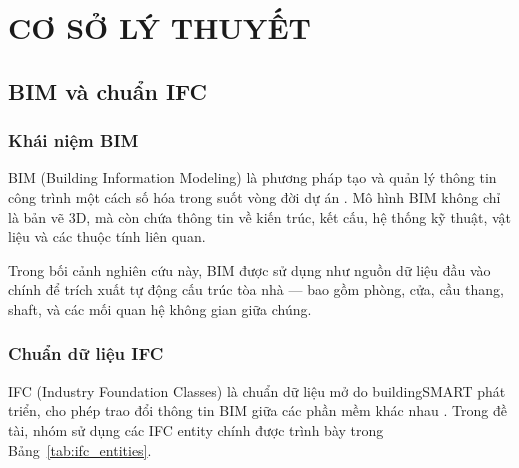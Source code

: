 
\chapter{CƠ SỞ LÝ THUYẾT}
\label{chap:cosoly}

\section{BIM và chuẩn IFC}
\label{sec:bimifc}

\subsection{Khái niệm BIM}

BIM (Building Information Modeling) là phương pháp tạo và quản lý thông tin công trình một cách số hóa trong suốt vòng đời dự án \cite{eastman2011bim}. Mô hình BIM không chỉ là bản vẽ 3D, mà còn chứa thông tin về kiến trúc, kết cấu, hệ thống kỹ thuật, vật liệu và các thuộc tính liên quan.

Trong bối cảnh nghiên cứu này, BIM được sử dụng như nguồn dữ liệu đầu vào chính để trích xuất tự động cấu trúc tòa nhà — bao gồm phòng, cửa, cầu thang, shaft, và các mối quan hệ không gian giữa chúng.

\subsection{Chuẩn dữ liệu IFC}

IFC (Industry Foundation Classes) là chuẩn dữ liệu mở do buildingSMART phát triển, cho phép trao đổi thông tin BIM giữa các phần mềm khác nhau \cite{ifc4_schema}. Trong đề tài, nhóm sử dụng các IFC entity chính được trình bày trong Bảng~\ref{tab:ifc_entities}.

